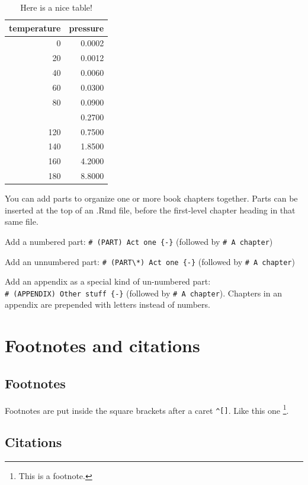 \documentclass[
]{book}
\theoremstyle{definition}
\theoremstyle{definition}
\theoremstyle{definition}
\theoremstyle{definition}
\theoremstyle{remark}
\begin{document}
\begin{table}

\caption{\label{tab:nice-tab}Here is a nice table!}
\centering
\begin{tabular}[t]{rr}
\toprule
temperature & pressure\\
\midrule
0 & 0.0002\\
20 & 0.0012\\
40 & 0.0060\\
60 & 0.0300\\
80 & 0.0900\\
\addlinespace
100 & 0.2700\\
120 & 0.7500\\
140 & 1.8500\\
160 & 4.2000\\
180 & 8.8000\\
\bottomrule
\end{tabular}
\end{table}

You can add parts to organize one or more book chapters together. Parts can be inserted at the top of an .Rmd file, before the first-level chapter heading in that same file.

Add a numbered part: \texttt{\#\ (PART)\ Act\ one\ \{-\}} (followed by \texttt{\#\ A\ chapter})

Add an unnumbered part: \texttt{\#\ (PART\textbackslash{}*)\ Act\ one\ \{-\}} (followed by \texttt{\#\ A\ chapter})

Add an appendix as a special kind of un-numbered part: \texttt{\#\ (APPENDIX)\ Other\ stuff\ \{-\}} (followed by \texttt{\#\ A\ chapter}). Chapters in an appendix are prepended with letters instead of numbers.

\hypertarget{footnotes-and-citations}{%
\chapter{Footnotes and citations}\label{footnotes-and-citations}}

\hypertarget{footnotes}{%
\section{Footnotes}\label{footnotes}}

Footnotes are put inside the square brackets after a caret \texttt{\^{}{[}{]}}. Like this one \footnote{This is a footnote.}.

\hypertarget{citations}{%
\section{Citations}\label{citations}}
\end{document}
